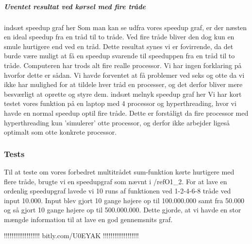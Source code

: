 \subparagraph{Uventet resultat ved kørsel med fire tråde}
indsæt speedup graf her \n\n
Som man kan se udfra vores speedup graf, er der næsten en ideal speedup fra en tråd til to tråde. Ved fire tråde bliver den dog kun en smule hurtigere end ved en tråd. Dette resultat synes vi er fovirrende, da det burde være muligt at få en speedup svarende til speeduppen fra en tråd til to tråde. Computeren har trods alt fire realle processor. Vi har ingen forklaring på hvorfor dette er sådan. 
Vi havde forventet at få problemer ved seks og otte da vi ikke har mulighed for at tildele hver tråd en processer, og det derfor bliver mere besværligt at oprette og styre dem. 
indsæt melnyk speedup graf her \n\n
Vi har kort testet vores funktion på en laptop med 4 processor og hyperthreading, hvor vi havde en normal speedup optil fire tråde. Dette er forståligt da fire processor med hyperthreading kun 'simulerer' otte processor, og derfor ikke arbejder ligeså optimalt som otte konkrete processor.

\subsubsection{Tests}
\label{O1_Tests}
Til at teste om vores forbedret multitrådet sum-funktion kørte hurtigere med flere tråde, brugte vi en speedupgraf som nævnt i /ref{O1_2}. For at lave en ordenlig speedupgraf lavede vi 10 runs af funktionen ved 1-2-4-6-8 tråde ved input 10.000. Input blev gjort 10 gange højere op til 100.000.000 samt fra 50.000 og så gjort 10 gange højere op til 500.000.000. Dette gjorde, at vi havde en stor mængde information til at lave en god gennemsnits graf. 


!!!!!!!!!!!!!!!!!!!
bitly.com/U0EYAK
!!!!!!!!!!!!!!!!!!!



